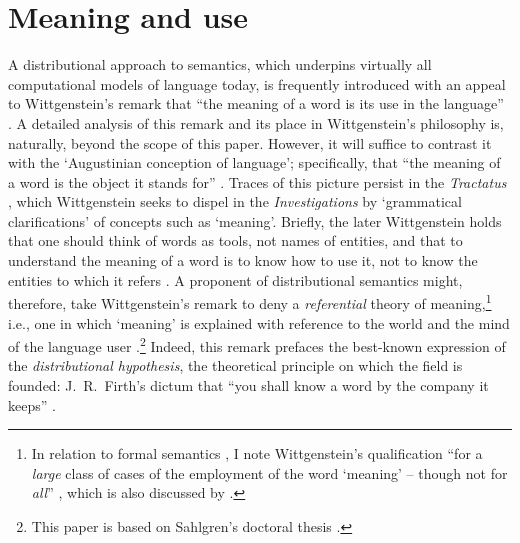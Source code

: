 
\section{Meaning and use}
\label{meaning-and-use}

A distributional approach to semantics, which underpins virtually all computational
models of language today, is frequently introduced with an appeal to Wittgenstein's
remark that ``the meaning of a word is its use in the language''
\parencites*[25\textsuperscript{c}]{Wittgenstein2009}.
A detailed analysis of this remark and its place in Wittgenstein's philosophy is,
naturally, beyond the scope of this paper.
However, it will suffice to contrast it with the `Augustinian conception of language';
specifically, that ``the meaning of a word is the object it stands for''
\parencites[2]{Baker2005}.
Traces of this picture persist in the \emph{Tractatus} \parencites*{Wittgenstein2001},
which Wittgenstein seeks to dispel in the \emph{Investigations}
\parencites*{Wittgenstein2009} by `grammatical clarifications' of concepts such as
`meaning'.
Briefly, the later Wittgenstein holds that one should think of words as tools, not
names of entities, and that to understand the meaning of a word is to know how to use
it, not to know the entities to which it refers \parencites[14-15]{Baker2005}.
A proponent of distributional semantics might, therefore, take Wittgenstein's remark to
deny a \emph{referential} theory of meaning,\footnote{In relation to formal semantics
  , I note Wittgenstein's qualification ``for a \emph{large}
  class of cases of the employment of the word `meaning' -- though not for \emph{all}''
  \parencites*[25\textsuperscript{c}]{Wittgenstein2009}, which is also discussed by
  \textcites[129-158]{Baker2005}.
} i.e., one in which `meaning' is explained with
reference to the world and the mind of the language user
\parencites[2]{Sahlgren2008}.\footnote{This paper is based on Sahlgren's doctoral thesis
  \parencites*{Sahlgren2006}.
}
Indeed, this remark prefaces the best-known expression of the \emph{distributional
  hypothesis}, the theoretical principle on which the field is founded: J.~R.~Firth's
dictum that ``you shall know a word by the company it keeps''
\parencites*[11]{Firth1957}.

